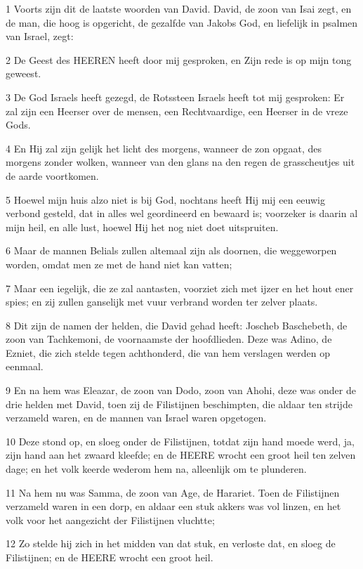 \par 1 Voorts zijn dit de laatste woorden van David. David, de zoon van Isai zegt, en de man, die hoog is opgericht, de gezalfde van Jakobs God, en liefelijk in psalmen van Israel, zegt:
\par 2 De Geest des HEEREN heeft door mij gesproken, en Zijn rede is op mijn tong geweest.
\par 3 De God Israels heeft gezegd, de Rotssteen Israels heeft tot mij gesproken: Er zal zijn een Heerser over de mensen, een Rechtvaardige, een Heerser in de vreze Gods.
\par 4 En Hij zal zijn gelijk het licht des morgens, wanneer de zon opgaat, des morgens zonder wolken, wanneer van den glans na den regen de grasscheutjes uit de aarde voortkomen.
\par 5 Hoewel mijn huis alzo niet is bij God, nochtans heeft Hij mij een eeuwig verbond gesteld, dat in alles wel geordineerd en bewaard is; voorzeker is daarin al mijn heil, en alle lust, hoewel Hij het nog niet doet uitspruiten.
\par 6 Maar de mannen Belials zullen altemaal zijn als doornen, die weggeworpen worden, omdat men ze met de hand niet kan vatten;
\par 7 Maar een iegelijk, die ze zal aantasten, voorziet zich met ijzer en het hout ener spies; en zij zullen ganselijk met vuur verbrand worden ter zelver plaats.
\par 8 Dit zijn de namen der helden, die David gehad heeft: Joscheb Baschebeth, de zoon van Tachkemoni, de voornaamste der hoofdlieden. Deze was Adino, de Ezniet, die zich stelde tegen achthonderd, die van hem verslagen werden op eenmaal.
\par 9 En na hem was Eleazar, de zoon van Dodo, zoon van Ahohi, deze was onder de drie helden met David, toen zij de Filistijnen beschimpten, die aldaar ten strijde verzameld waren, en de mannen van Israel waren opgetogen.
\par 10 Deze stond op, en sloeg onder de Filistijnen, totdat zijn hand moede werd, ja, zijn hand aan het zwaard kleefde; en de HEERE wrocht een groot heil ten zelven dage; en het volk keerde wederom hem na, alleenlijk om te plunderen.
\par 11 Na hem nu was Samma, de zoon van Age, de Harariet. Toen de Filistijnen verzameld waren in een dorp, en aldaar een stuk akkers was vol linzen, en het volk voor het aangezicht der Filistijnen vluchtte;
\par 12 Zo stelde hij zich in het midden van dat stuk, en verloste dat, en sloeg de Filistijnen; en de HEERE wrocht een groot heil.
